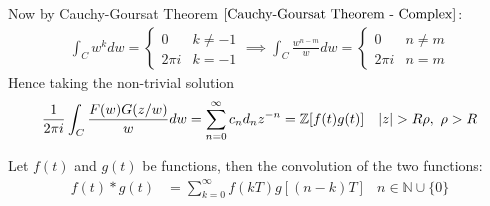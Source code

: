 \documentclass[12pt, english]{book}
\makeatletter
\renewenvironment{proof}[1][\proofname]{\par
	\pushQED{\qed}%
	\normalfont \topsep6\p@\@plus6\p@\relax
	\list{}{%
		\settowidth{\leftmargin}{\itshape\proofname:\hskip\labelsep}%
		\setlength{\labelwidth}{0pt}%
		\setlength{\itemindent}{-\leftmargin}%
		}%
	\item[\hskip\labelsep\itshape#1\@addpunct{:}]\ignorespaces
	}{\popQED\endlist\@endpefalse}
\makeatother
\begin{document}
\begin{proof}
		Now by Cauchy-Goursat Theorem \(\cref{Cauchy-Goursat Theorem - Complex}\):
		\begin{align*}
			\int_{C} w^k dw =
			\begin{cases}
				0 & k\neq -1\\
				2\pi i & k = -1
			\end{cases}
			\implies
			\int_{C} \frac{w^{n-m}}{w} dw = 
			\begin{cases}
				0 & n \neq m\\
				2\pi i & n = m
			\end{cases}
		\end{align*}
		Hence taking the non-trivial solution
		\begin{align*}
			\frac{1}{2\pi i} \int_{C} \frac{F(w)G(z/w)}{w} dw
			&= \sum_{n=0}^{\infty} c_n d_n z^{-n} = \mathbb{Z}[f(t)g(t)]
				& \abs{z}> R\rho, \ \rho > R
		\end{align*}
	\end{proof}

	\begin{definition}[Convolution]
		\label{Convolution Definition - Complex}
		Let \(f(t)\) and \(g(t)\) be functions, then the convolution of the two functions:
		\begin{align*}
			f(t) \ast g(t) &= \sum_{k=0}^{\infty} f(kT) g[(n-k)T] & n \in \mathbb{N} \cup \{0\}
		\end{align*}
	\end{definition}
\end{document}
